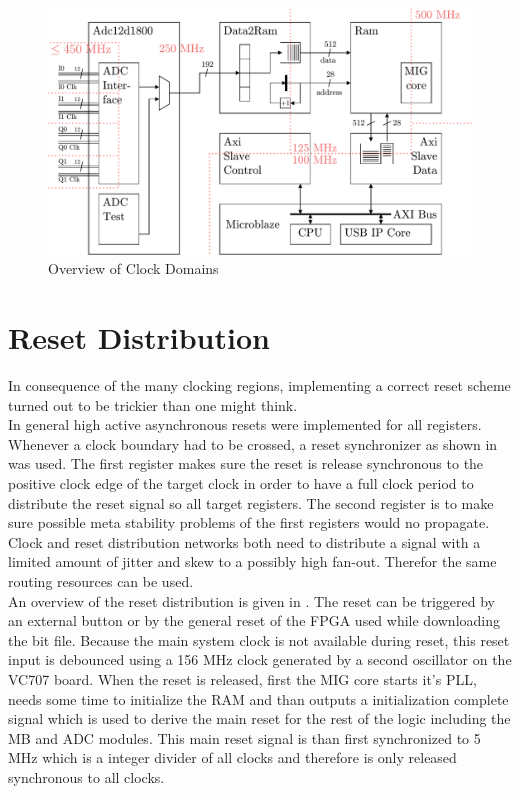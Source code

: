 \begin{figure}
  \centering
  \includegraphics[width=\textwidth]{figures/fpga_clock_domains_overview}
  \caption{Overview of Clock Domains}
  \label{fig:fpga_clock_domains}
\end{figure}

\section{Reset Distribution}
\label{sec:fpga_reset}

In consequence of the many clocking regions, implementing a correct
reset scheme turned out to be trickier than one might think. \\

In general high active asynchronous resets were implemented for all
registers. Whenever a clock boundary had to be crossed, a reset synchronizer
as shown in  was used. The first register
makes sure the reset is release synchronous to the positive clock edge
of the target clock in order to have a full clock period to distribute
the reset signal so all target registers. The second register is
to make sure possible meta stability problems of the first registers would
no propagate. Clock and reset distribution networks both need to
distribute a signal with a limited amount of jitter and skew to a possibly
high fan-out. Therefor the same routing resources can be used.  \\

An overview of the reset distribution is given in
. The reset can be triggered
by an external button or by the general reset of the \gls{FPGA}
used while downloading the bit file. Because the main system clock is
not available during reset, this reset input is debounced using a
156 MHz clock generated by a second oscillator on the VC707 board.
When the reset is released, first the \gls{MIG} core starts
it's \gls{PLL}, needs some time to initialize the \gls{RAM} and than
outputs a initialization complete signal which is used to derive the main reset
for the rest of the logic including the \gls{MB} and \gls{ADC} modules.
This main reset signal is than first synchronized to 5 MHz which is a
integer divider of all clocks and therefore is only released synchronous
to all clocks. \\

